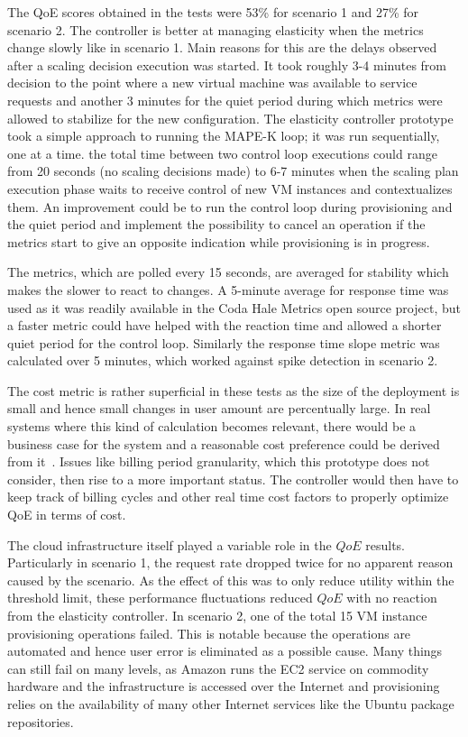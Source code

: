 \documentclass[english]{tktltiki2}
\theoremstyle{definition}
\theoremstyle{remark}
\begin{document}
The QoE scores obtained in the tests were 53\% for scenario 1 and 27\% for
scenario 2. The controller is better at managing elasticity when the metrics
change slowly like in scenario 1. Main reasons for this are the delays observed
after a scaling decision execution was started. It took roughly 3-4 minutes from
decision to the point where a new virtual machine was available to service
requests and another 3 minutes for the quiet period during which metrics were
allowed to stabilize for the new configuration. The elasticity controller
prototype took a simple approach to running the MAPE-K loop; it was run
sequentially, one at a time. the total time between two control loop executions
could range from 20 seconds (no scaling decisions made) to 6-7 minutes when the
scaling plan execution phase waits to receive control of new VM instances and
contextualizes them. An improvement could be to run the control loop during
provisioning and the quiet period and implement the possibility to cancel an
operation if the metrics start to give an opposite indication while provisioning
is in progress.

The metrics, which are polled every 15 seconds, are averaged for stability which
makes the slower to react to changes. A 5-minute average for response time was
used as it was readily available in the Coda Hale Metrics open source project,
but a faster metric could have helped with the reaction time and allowed a
shorter quiet period for the control loop. Similarly the response time slope
metric was calculated over 5 minutes, which worked against spike detection in
scenario 2.

The cost metric is rather superficial in these tests as the size of the
deployment is small and hence small changes in user amount are percentually
large. In real systems where this kind of calculation becomes relevant, there
would be a business case for the system and a reasonable cost preference could be
derived from it~\cite{Suleiman2011}. Issues like billing period granularity,
which this prototype does not consider, then rise to a more important status.
The controller would then have to keep track of billing cycles and other real
time cost factors to properly optimize QoE in terms of cost.

The cloud infrastructure itself played a variable role in the $QoE$ results.
Particularly in scenario 1, the request rate dropped twice for no apparent
reason caused by the scenario. As the effect of this was to only reduce utility
within the threshold limit, these performance fluctuations reduced $QoE$ with no
reaction from the elasticity controller. In scenario 2, one of the total 15 VM
instance provisioning operations failed. This is notable because the operations
are automated and hence user error is eliminated as a possible cause. Many
things can still fail on many levels, as Amazon runs the EC2 service on
commodity hardware and the infrastructure is accessed over the Internet and
provisioning relies on the availability of many other Internet services like the
Ubuntu package repositories. 
\end{document}
